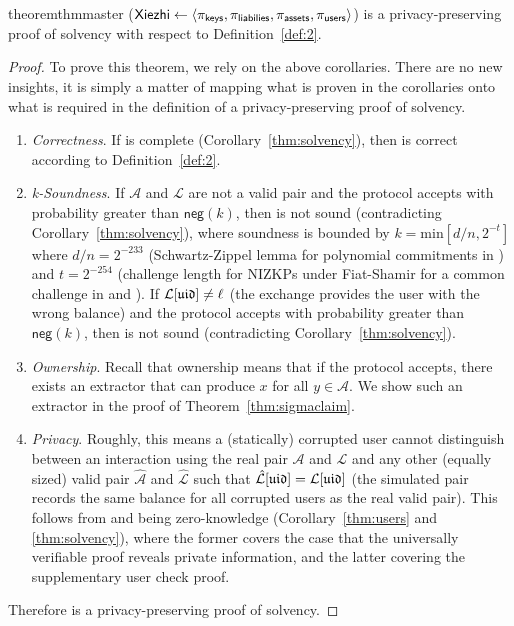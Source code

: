 
\section{\Sys}

\begin{restatable}{theorem}{thmmaster}
\label{thm:master}
\Sys ($\textsf{Xiezhi}\leftarrow\langle \pi_\mathsf{keys}, \pi_\mathsf{liabilies}, \pi_\mathsf{assets}, \pi_\mathsf{users} \rangle$) is a privacy-preserving proof of solvency with respect to Definition~\ref{def:2}. 
\end{restatable}

\begin{proof}
To prove this theorem, we rely on the above corollaries. There are no new insights, it is simply a matter of mapping what is proven in the corollaries onto what is required in the definition of a privacy-preserving proof of solvency.
\begin{enumerate}
    \item \textit{Correctness}. If \pos is complete (Corollary~\ref{thm:solvency}), then \Sys is correct according to Definition~\ref{def:2}.
    \item \textit{k-Soundness}. If $\mathcal{A}$ and $\mathcal{L}$ are not a valid pair and the protocol accepts with probability greater than $\mathsf{neg}(k)$, then \pos is not sound (contradicting Corollary~\ref{thm:solvency}), where soundness is bounded by $k=\mathrm{min}[d/n,2^{-t}]$ where $d/n=2^{-233}$ (Schwartz-Zippel lemma for polynomial commitments in \bls) and $t=2^{-254}$ (challenge length for NIZKPs under Fiat-Shamir for a common challenge in \secp and \bls). If $\mathcal{L}[\mathfrak{uid}] \neq \ell$ (\ie the exchange provides the user with the wrong balance) and the protocol accepts with probability greater than $\mathsf{neg}(k)$, then \pos is not sound (contradicting Corollary~\ref{thm:solvency}).
    \item \textit{Ownership}. Recall that ownership means that if the protocol accepts, there exists an extractor that can produce $x$ for all $y \in \mathcal{A}$. We show such an extractor in the proof of Theorem~\ref{thm:sigmaclaim}.
    \item \textit{Privacy}. Roughly, this means a (statically) corrupted user cannot distinguish between an interaction using the real pair $\mathcal{A}$ and $\mathcal{L}$ and any other (equally sized) valid pair $\hat{\mathcal{A}}$ and $\hat{\mathcal{L}}$ such that $\hat{\mathcal{L}}[\mathfrak{uid}] = \mathcal{L}[\mathfrak{uid}]$ (\ie the simulated pair records the same balance for all corrupted users as the real valid pair). This follows from \userproof and \pos being zero-knowledge (Corollary~\ref{thm:users} and \ref{thm:solvency}), where the former covers the case that the universally verifiable proof reveals private information, and the latter covering the supplementary user check proof. 
\end{enumerate}
Therefore \Sys is a privacy-preserving proof of solvency.
\end{proof}

